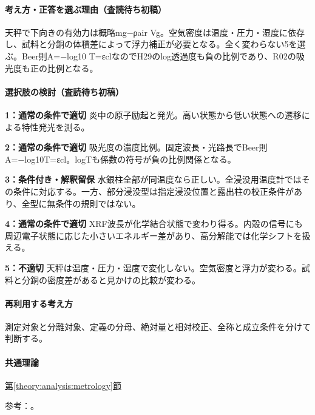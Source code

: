 \paragraph{考え方・正答を選ぶ理由（査読待ち初稿）} 天秤で下向きの有効力は概略mg−ρair Vg。空気密度は温度・圧力・湿度に依存し、試料と分銅の体積差によって浮力補正が必要となる。全く変わらない5を選ぶ。Beer則A=−log10 T=εclなのでH29のlog透過度も負の比例であり、R02の吸光度も正の比例となる。

\paragraph{選択肢の検討（査読待ち初稿）}\mbox{}\par

\noindent\textbf{1：通常の条件で適切} 炎中の原子励起と発光。高い状態から低い状態への遷移による特性発光を測る。\par

\noindent\textbf{2：通常の条件で適切} 吸光度の濃度比例。固定波長・光路長でBeer則A=−log10T=εcl。logTも係数の符号が負の比例関係となる。\par

\noindent\textbf{3：条件付き・解釈留保} 水銀柱全部が同温度なら正しい。全浸没用温度計ではその条件に対応する。一方、部分浸没型は指定浸没位置と露出柱の校正条件があり、全型に無条件の規則ではない。\par

\noindent\textbf{4：通常の条件で適切} XRF波長が化学結合状態で変わり得る。内殻の信号にも周辺電子状態に応じた小さいエネルギー差があり、高分解能では化学シフトを扱える。\par

\noindent\textbf{5：不適切} 天秤は温度・圧力・湿度で変化しない。空気密度と浮力が変わる。試料と分銅の密度差があると見かけの比較が変わる。\par

\paragraph{再利用する考え方} 測定対象と分離対象、定義の分母、絶対量と相対校正、全称と成立条件を分けて判断する。

\paragraph{共通理論} \hyperref[theory:analysis:metrology]{第\ref*{theory:analysis:metrology}節}

\par 参考：\cite{analysis49_beer_ref,analysis49_thermo_ref,analysis49_buoy_ref,analysis49_sxes_ref}。

